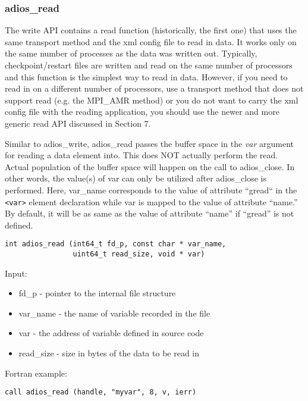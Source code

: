 \subsubsection{adios\_read}
\label{section:adios_read}

The write API contains a read function (historically, the first one) that uses 
the same transport method and the xml config file to read in data. It works only 
on the same number of processes as the data was written out. Typically, checkpoint/restart 
files are written and read on the same number of processors and this function is 
the simplest way to read in data. However, if you need to read in on a different 
number of processors, use a transport method that does not support read (e.g. 
the MPI\_AMR method) or you do not want to carry the xml config file with the 
reading application, you should use the newer and more generic read API discussed 
in Section 7.

Similar to adios\_write, adios\_read passes the buffer space in the \textit{var} argument 
for reading a data element into. This does NOT actually perform the read. Actual 
population of the buffer space will happen on the call to adios\_close. In other 
words, the value(s) of var can only be utilized after adios\_close is performed. 
Here, var\_name corresponds to the value of attribute ``gread`` in the \verb+<var>+
element declaration while var is mapped to the value of attribute ``name.'' By 
default, it will be as same as the value of attribute ``name'' if ``gread'' is 
not defined.

\begin{lstlisting}[alsolanguage=C,caption={},label={}]
int adios_read (int64_t fd_p, const char * var_name, 
                uint64_t read_size, void * var)
\end{lstlisting}

Input:

\begin{itemize}
\item fd\_p - pointer to the internal file structure
\item var\_name - the name of variable recorded in the file
\item var - the address of variable defined in source code
\item read\_size -  size in bytes of the data to be read in 
\end{itemize}

Fortran example: 
\begin{lstlisting}[alsolanguage=Fortran,caption={},label={}]
call adios_read (handle, "myvar", 8, v, ierr)
\end{lstlisting}

